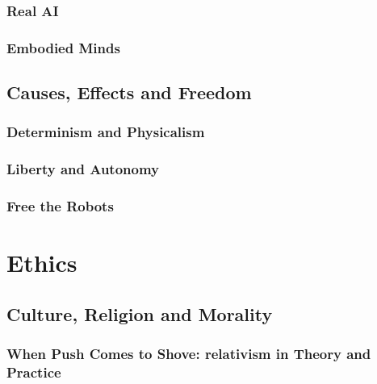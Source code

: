 \documentclass[
  12pt, openany]{book}
\begin{document}
\hypertarget{real-ai}{%
\subsection{Real AI}\label{real-ai}}

\hypertarget{embodied-minds}{%
\subsection{Embodied Minds}\label{embodied-minds}}

\hypertarget{causes-effects-and-freedom}{%
\section{Causes, Effects and Freedom}\label{causes-effects-and-freedom}}

\hypertarget{determinism-and-physicalism}{%
\subsection{Determinism and Physicalism}\label{determinism-and-physicalism}}

\hypertarget{liberty-and-autonomy}{%
\subsection{Liberty and Autonomy}\label{liberty-and-autonomy}}

\hypertarget{free-the-robots}{%
\subsection{Free the Robots}\label{free-the-robots}}

\hypertarget{ethics}{%
\chapter{Ethics}\label{ethics}}

\hypertarget{culture-religion-and-morality}{%
\section{Culture, Religion and Morality}\label{culture-religion-and-morality}}

\hypertarget{when-push-comes-to-shove-relativism-in-theory-and-practice}{%
\subsection{When Push Comes to Shove: relativism in Theory and Practice}\label{when-push-comes-to-shove-relativism-in-theory-and-practice}}
\end{document}
